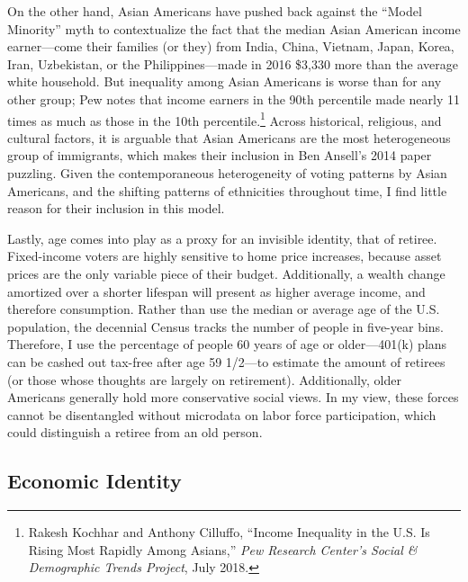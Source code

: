 \documentclass[12pt,oneside]{psthesis}
\begin{document}
On the other hand, Asian Americans have pushed back against the ``Model Minority'' myth to contextualize the fact that the median Asian American income earner---come their families (or they) from India, China, Vietnam, Japan, Korea, Iran, Uzbekistan, or the Philippines---made in 2016 \$3,330 more than the average white household.
But inequality among Asian Americans is worse than for any other group; Pew notes that income earners in the 90th percentile made nearly 11 times as much as those in the 10th percentile.\footnote{Rakesh Kochhar and Anthony Cilluffo, ``Income Inequality in the U.S. Is Rising Most Rapidly Among Asians,'' \emph{Pew Research Center's Social \& Demographic Trends Project}, July 2018.}
Across historical, religious, and cultural factors, it is arguable that Asian Americans are the most heterogeneous group of immigrants, which makes their inclusion in Ben Ansell's 2014 paper puzzling.
Given the contemporaneous heterogeneity of voting patterns by Asian Americans, and the shifting patterns of ethnicities throughout time, I find little reason for their inclusion in this model.

Lastly, age comes into play as a proxy for an invisible identity, that of retiree.
Fixed-income voters are highly sensitive to home price increases, because asset prices are the only variable piece of their budget.
Additionally, a wealth change amortized over a shorter lifespan will present as higher average income, and therefore consumption.
Rather than use the median or average age of the U.S. population, the decennial Census tracks the number of people in five-year bins.
Therefore, I use the percentage of people 60 years of age or older---401(k) plans can be cashed out tax-free after age 59 1/2---to estimate the amount of retirees (or those whose thoughts are largely on retirement).
Additionally, older Americans generally hold more conservative social views.
In my view, these forces cannot be disentangled without microdata on labor force participation, which could distinguish a retiree from an old person.

\hypertarget{economic-identity}{%
\subsection{Economic Identity}\label{economic-identity}}
\end{document}
